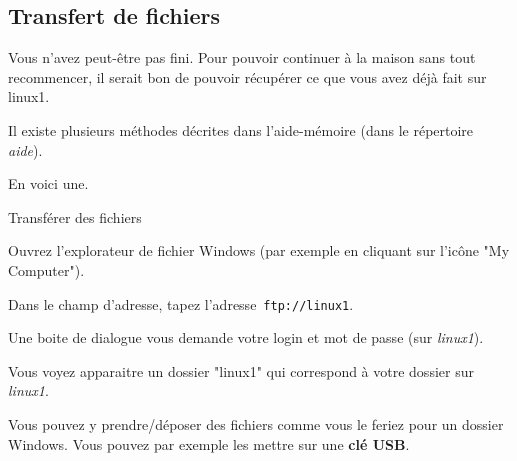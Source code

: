 \documentclass[a4paper,11pt]{article}
\begin{document}
        \subsection{Transfert de fichiers}  
         	Vous n'avez peut-\^etre pas fini. Pour pouvoir continuer \`a la maison sans tout recommencer, 
         	il serait bon de pouvoir r\'ecup\'erer ce que vous avez d\'ej\`a fait sur linux1. \par
				
         	Il existe plusieurs m\'ethodes d\'ecrites dans l'aide-m\'emoire (dans le r\'epertoire \textit{aide}). \par
				
          	En voici une.  \par
				
            	\par
        \begin{Tutoriel}{Transférer des fichiers}
		\begin{steps}
				
			\item Ouvrez l'explorateur de fichier Windows (par exemple en cliquant sur l'ic\^one "My Computer").
			\item Dans le champ d'adresse, tapez l'adresse \,\verb_ftp://linux1_.
			\item Une boite de dialogue vous demande votre login et mot de passe (sur \textit{linux1}).
			\item Vous voyez apparaitre un dossier "linux1" qui correspond \`a votre dossier sur \textit{linux1}. 
			\item Vous pouvez y prendre/d\'eposer des fichiers comme vous le feriez pour un dossier Windows. 
            			Vous pouvez par exemple les mettre sur une \textbf{cl\'e USB}.
          
		\end{steps}
	\end{Tutoriel}			
				
				
\end{document}
